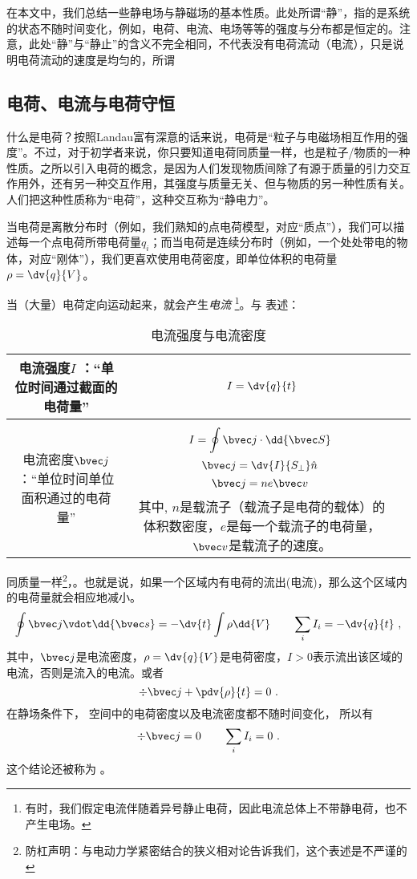 

在本文中，我们总结一些静电场与静磁场的基本性质。此处所谓“静”，指的是系统的状态不随时间变化，例如，电荷、电流、电场等等的强度与分布都是恒定的。注意，此处“静”与“静止”的含义不完全相同，不代表没有电荷流动（电流），只是说明电荷流动的速度是均匀的，所谓

\subsection{电荷、电流与电荷守恒}
什么是电荷？按照Landau富有深意的话来说，电荷是“粒子与电磁场相互作用的强度”。不过，对于初学者来说，你只要知道电荷同质量一样，也是粒子/物质的一种性质。之所以引入电荷的概念，是因为人们发现物质间除了有源于质量的引力交互作用外，还有另一种交互作用，其强度与质量无关、但与物质的另一种性质有关。人们把这种性质称为“电荷”，这种交互称为“静电力”。

当电荷是离散分布时（例如，我们熟知的点电荷模型，对应“质点”），我们可以描述每一个点电荷所带电荷量$q_i$；而当电荷是连续分布时（例如，一个处处带电的物体，对应“刚体”），我们更喜欢使用电荷密度，即单位体积的电荷量$\rho = \dv{q}{V}$。

当（大量）电荷定向运动起来，就会产生\textsl{电流} \footnote{有时，我们假定电流伴随着异号静止电荷，因此电流总体上不带静电荷，也不产生电场。}。与 表述：

\begin{table}[ht]
\centering
\caption{电流强度与电流密度}\label{tab_estfid3}
\begin{tabular}{|c|c|c|}
\hline
电流强度$I$ ：“单位时间通过截面的电荷量” & $I = \dv{q}{t}$ \\
\hline
电流密度$\bvec j$ ：“单位时间单位面积通过的电荷量” & $$I = \oint \bvec j \cdot \dd {\bvec S}~$$ $$\bvec j= \dv{I}{S_\perp} \hat n~$$ $$\bvec j = n e \bvec v~$$其中, $n$是载流子（载流子是电荷的载体）的体积数密度，$e$是每一个载流子的电荷量，$\bvec v$是载流子的速度。 \\
\hline
\end{tabular}
\end{table}


同质量一样\footnote{防杠声明：与电动力学紧密结合的狭义相对论告诉我们，这个表述是不严谨的}，。也就是说，如果一个区域内有电荷的流出(电流)，那么这个区域内的电荷量就会相应地减小。
$$
\oint \bvec j \vdot \dd{\bvec s}  =  - \dv{t} \int \rho \dd{V} \qquad \sum_i I_i = -\dv{q}{t}~,
$$
其中，$\bvec j$是电流密度，$\rho = \dv{q}{V}$是电荷密度，$I>0$表示流出该区域的电流，否则是流入的电流。或者
$$
\div \bvec j + \pdv{\rho}{t} = 0~.
$$
在静场条件下， 空间中的电荷密度以及电流密度都不随时间变化， 所以有
$$
\div \bvec j = 0 \qquad \sum_i I_i = 0~.$$
这个结论还被称为 。

